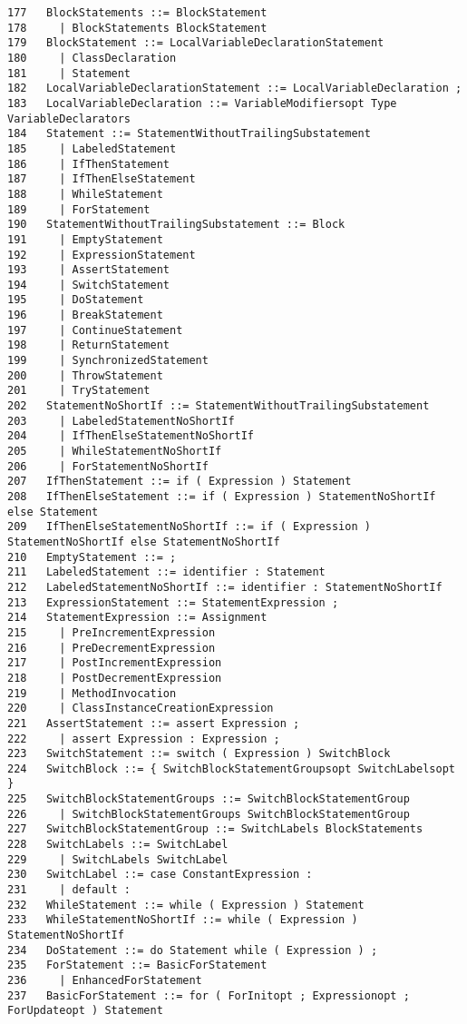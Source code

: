{\begin{verbatim}
177   BlockStatements ::= BlockStatement
178     | BlockStatements BlockStatement
179   BlockStatement ::= LocalVariableDeclarationStatement
180     | ClassDeclaration
181     | Statement
182   LocalVariableDeclarationStatement ::= LocalVariableDeclaration ;
183   LocalVariableDeclaration ::= VariableModifiersopt Type VariableDeclarators
184   Statement ::= StatementWithoutTrailingSubstatement
185     | LabeledStatement
186     | IfThenStatement
187     | IfThenElseStatement
188     | WhileStatement
189     | ForStatement
190   StatementWithoutTrailingSubstatement ::= Block
191     | EmptyStatement
192     | ExpressionStatement
193     | AssertStatement
194     | SwitchStatement
195     | DoStatement
196     | BreakStatement
197     | ContinueStatement
198     | ReturnStatement
199     | SynchronizedStatement
200     | ThrowStatement
201     | TryStatement
202   StatementNoShortIf ::= StatementWithoutTrailingSubstatement
203     | LabeledStatementNoShortIf
204     | IfThenElseStatementNoShortIf
205     | WhileStatementNoShortIf
206     | ForStatementNoShortIf
207   IfThenStatement ::= if ( Expression ) Statement
208   IfThenElseStatement ::= if ( Expression ) StatementNoShortIf else Statement
209   IfThenElseStatementNoShortIf ::= if ( Expression ) StatementNoShortIf else StatementNoShortIf
210   EmptyStatement ::= ;
211   LabeledStatement ::= identifier : Statement
212   LabeledStatementNoShortIf ::= identifier : StatementNoShortIf
213   ExpressionStatement ::= StatementExpression ;
214   StatementExpression ::= Assignment
215     | PreIncrementExpression
216     | PreDecrementExpression
217     | PostIncrementExpression
218     | PostDecrementExpression
219     | MethodInvocation
220     | ClassInstanceCreationExpression
221   AssertStatement ::= assert Expression ;
222     | assert Expression : Expression ;
223   SwitchStatement ::= switch ( Expression ) SwitchBlock
224   SwitchBlock ::= { SwitchBlockStatementGroupsopt SwitchLabelsopt }
225   SwitchBlockStatementGroups ::= SwitchBlockStatementGroup
226     | SwitchBlockStatementGroups SwitchBlockStatementGroup
227   SwitchBlockStatementGroup ::= SwitchLabels BlockStatements
228   SwitchLabels ::= SwitchLabel
229     | SwitchLabels SwitchLabel
230   SwitchLabel ::= case ConstantExpression :
231     | default :
232   WhileStatement ::= while ( Expression ) Statement
233   WhileStatementNoShortIf ::= while ( Expression ) StatementNoShortIf
234   DoStatement ::= do Statement while ( Expression ) ;
235   ForStatement ::= BasicForStatement
236     | EnhancedForStatement
237   BasicForStatement ::= for ( ForInitopt ; Expressionopt ; ForUpdateopt ) Statement

\end{verbatim}}
